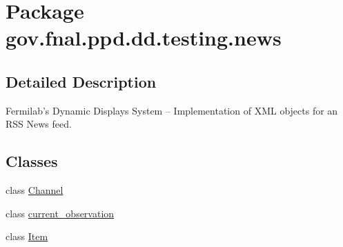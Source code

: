 \hypertarget{namespacegov_1_1fnal_1_1ppd_1_1dd_1_1testing_1_1news}{\section{Package gov.\-fnal.\-ppd.\-dd.\-testing.\-news}
\label{namespacegov_1_1fnal_1_1ppd_1_1dd_1_1testing_1_1news}
}


\subsection{Detailed Description}
Fermilab's Dynamic Displays System -- Implementation of X\-M\-L objects for an R\-S\-S News feed.\subsection*{Classes}
\begin{DoxyCompactItemize}
\item 
class \hyperlink{classgov_1_1fnal_1_1ppd_1_1dd_1_1testing_1_1news_1_1Channel}{Channel}
\item 
class \hyperlink{classgov_1_1fnal_1_1ppd_1_1dd_1_1testing_1_1news_1_1current__observation}{current\-\_\-observation}
\item 
class \hyperlink{classgov_1_1fnal_1_1ppd_1_1dd_1_1testing_1_1news_1_1Item}{Item}
\end{DoxyCompactItemize}
